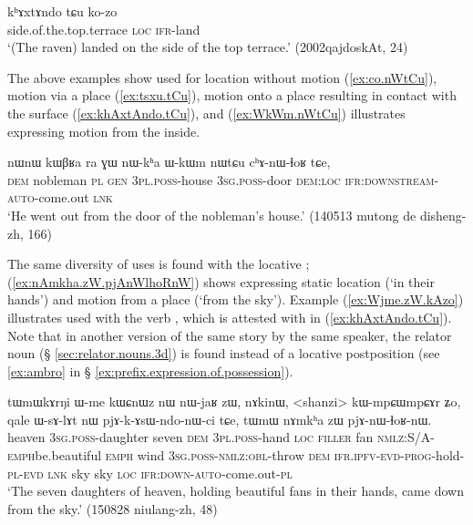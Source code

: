 \begin{exe}
\ex \label{ex:khAxtAndo.tCu}
\gll  kʰɤxtɤndo tɕu ko-zo \\
side.of.the.top.terrace \textsc{loc} \textsc{ifr}-land \\
\glt `(The raven) landed on the side of the top terrace.' (2002qajdoskAt, 24)
\end{exe}

The above examples show  used for location without motion (\ref{ex:co.nWtCu}), motion via a place (\ref{ex:tsxu.tCu}), motion onto a place resulting in contact with the surface (\ref{ex:khAxtAndo.tCu}), and (\ref{ex:WkWm.nWtCu}) illustrates  expressing motion from the inside.

\begin{exe}
\ex \label{ex:WkWm.nWtCu}
\gll nɯnɯ kɯβʁa ra ɣɯ nɯ-kʰa ɯ-kɯm nɯtɕu cʰɤ-nɯ-ɬoʁ tɕe, \\
\textsc{dem} nobleman \textsc{pl} \textsc{gen} \textsc{3pl}.\textsc{poss}-house \textsc{3sg}.\textsc{poss}-door \textsc{dem}:\textsc{loc} \textsc{ifr}:\textsc{downstream}-\textsc{auto}-come.out \textsc{lnk} \\
\glt  `He went out from the door of the nobleman's house.' (140513 mutong de disheng-zh, 166)
\end{exe}

The same diversity of uses is found with the locative ; (\ref{ex:nAmkha.zW.pjAnWlhoRnW}) shows  expressing static location (`in their hands') and motion from a place (`from the sky').  Example (\ref{ex:Wjme.zW.kAzo}) illustrates  used with the verb , which is attested with  in (\ref{ex:khAxtAndo.tCu}). Note that in another version of the same story by the same speaker, the relator noun  (§ \ref{sec:relator.nouns.3d}) is found instead of a locative postposition (see \ref{ex:ambro} in § \ref{ex:prefix.expression.of.possession}).

\begin{exe}
\ex \label{ex:nAmkha.zW.pjAnWlhoRnW}
\gll tɯmɯkɤrŋi ɯ-me kɯɕnɯz nɯ nɯ-jaʁ zɯ, nɤkinɯ, <shanzi> kɯ-mpɕɯ\redp{}mpɕɤr ʑo, qale ɯ-sɤ-lɤt nɯ pjɤ-k-ɤsɯ-ndo-nɯ-ci tɕe,  tɯmɯ nɤmkʰa zɯ pjɤ-nɯ-ɬoʁ-nɯ. \\
heaven \textsc{3sg}.\textsc{poss}-daughter seven \textsc{dem} \textsc{3pl}.\textsc{poss}-hand \textsc{loc} \textsc{filler} fan \textsc{nmlz}:S/A-\textsc{emph}\redp{}be.beautiful \textsc{emph} wind \textsc{3sg}.\textsc{poss}-\textsc{nmlz}:\textsc{obl}-throw \textsc{dem} \textsc{ifr}.\textsc{ipfv}-\textsc{evd}-\textsc{prog}-hold-\textsc{pl}-\textsc{evd} \textsc{lnk} sky sky \textsc{loc} \textsc{ifr}:\textsc{down}-\textsc{auto}-come.out-\textsc{pl} \\
\glt `The seven daughters of heaven, holding beautiful fans in their hands, came down from the sky.' (150828 niulang-zh, 48)
\end{exe}

